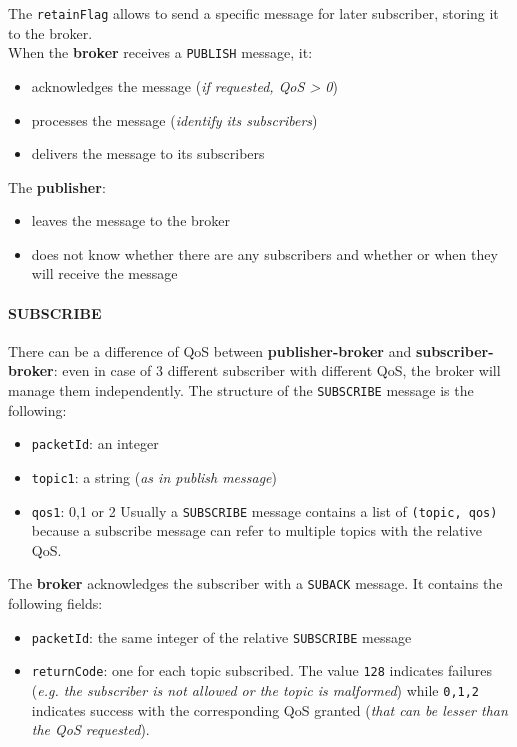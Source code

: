 \documentclass[10pt,a4paper]{report}
\theoremstyle{definition}
\begin{document}
The \texttt{retainFlag} allows to send a specific message for later subscriber, storing it to the broker.\\
When the \textbf{broker} receives a \texttt{PUBLISH} message, it:
\begin{itemize}
	\item 
	acknowledges the message (\textit{if requested, QoS > 0})
	\item 
	processes the message (\textit{identify its subscribers})
	\item 
	delivers the message to its subscribers
\end{itemize}
	The \textbf{publisher}:
\begin{itemize}
	\item 
leaves the message to the broker
\item 
does not know whether there are any subscribers and whether or when they will receive the message
\end{itemize}


\paragraph{SUBSCRIBE}\label{sec:subscribe}
There can be a difference of QoS between \textbf{publisher-broker} and \textbf{subscriber-broker}: even in case of 3 different subscriber with different QoS, the broker will manage them independently.
The structure of the \texttt{SUBSCRIBE} message is the following:
\begin{itemize}
	\item 
	\texttt{packetId}: an integer
	\item 
	\texttt{topic1}: a string (\textit{as in publish message})
	\item 
	\texttt{qos1}: 0,1 or 2
	Usually a \texttt{SUBSCRIBE} message contains a list of \texttt{(topic, qos)} because a subscribe message can refer to multiple topics with the relative QoS.
\end{itemize}

The \textbf{broker} acknowledges the subscriber with a \texttt{SUBACK} message. It contains the following fields:
\begin{itemize}
	\item 
	\texttt{packetId}: the same integer of the relative \texttt{SUBSCRIBE} message
	\item 
	\texttt{returnCode}: one for each topic subscribed. The value \texttt{128} indicates failures (\textit{e.g. the subscriber is not allowed or the topic is malformed}) while \texttt{0,1,2} indicates success with the corresponding QoS granted (\textit{that can be lesser than the QoS requested}).
\end{itemize}
\end{document}
